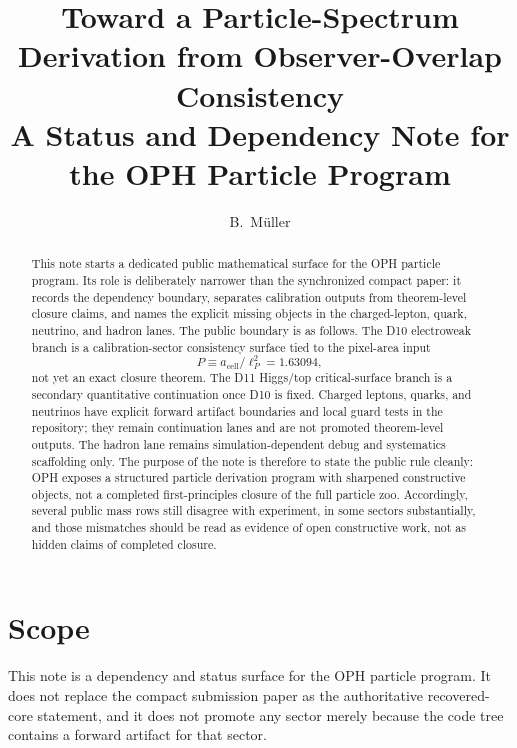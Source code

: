 \documentclass[11pt]{article}
\title{Toward a Particle-Spectrum Derivation from Observer-Overlap Consistency\\[0.4em]
\large A Status and Dependency Note for the OPH Particle Program}
\author{B.\ M\"uller}
\date{\OPHPaperReleaseDate}
\begin{document}
\maketitle
\OPHPaperReleaseBanner

\begin{abstract}
This note starts a dedicated public mathematical surface for the OPH particle
program. Its role is deliberately narrower than the synchronized compact paper:
it records the dependency boundary, separates calibration outputs from
theorem-level closure claims, and names the explicit missing objects in the
charged-lepton, quark, neutrino, and hadron lanes. The public boundary is as
follows. The D10 electroweak branch is a calibration-sector consistency
surface tied to the pixel-area input
\[
P \equiv a_{\mathrm{cell}}/\ell_P^2 = 1.63094,
\]
not yet an exact closure theorem. The D11 Higgs/top critical-surface branch is
a secondary quantitative continuation once D10 is fixed. Charged leptons,
quarks, and neutrinos have explicit forward artifact boundaries and local guard
tests in the repository; they remain continuation lanes and are not promoted
theorem-level outputs. The hadron lane remains simulation-dependent
debug and systematics scaffolding only. The purpose of the note is therefore to
state the public rule cleanly: OPH exposes a structured particle
derivation program with sharpened constructive objects, not a completed
first-principles closure of the full particle zoo. Accordingly, several public
mass rows still disagree with experiment, in some sectors substantially, and
those mismatches should be read as evidence of open constructive work, not as
hidden claims of completed closure.
\end{abstract}

\section{Scope}

This note is a dependency and status surface for the OPH particle program. It
does not replace the compact submission paper as the authoritative recovered-core
statement, and it does not promote any sector merely because the code tree
contains a forward artifact for that sector.
\end{document}
